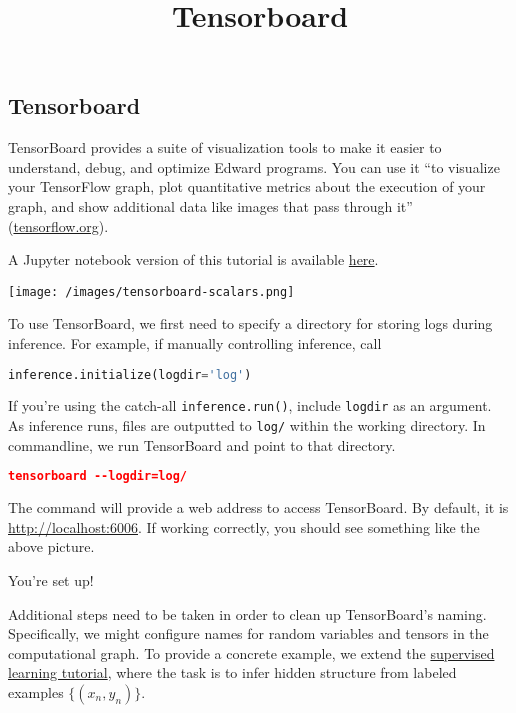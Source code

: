 \title{Tensorboard}

\subsection{Tensorboard}

TensorBoard provides a suite of visualization tools to make it easier
to understand, debug, and optimize Edward programs. You can use it
``to visualize your TensorFlow graph, plot quantitative metrics about
the execution of your graph, and show additional data like images that
pass through it''
(\href{https://www.tensorflow.org/get_started/summaries_and_tensorboard}
{tensorflow.org}).

A Jupyter notebook version of this tutorial is available
\href{http://nbviewer.jupyter.org/github/blei-lab/edward/blob/master/notebooks/tensorboard.ipynb}{here}.

\texttt{[image: /images/tensorboard-scalars.png]}

To use TensorBoard, we first need to specify a directory for storing
logs during inference. For example, if manually controlling inference,
call

\begin{lstlisting}[language=Python]
inference.initialize(logdir='log')
\end{lstlisting}

If you're using the catch-all \texttt{inference.run()}, include
\texttt{logdir} as an argument. As inference runs, files are
outputted to \texttt{log/} within the working directory. In
commandline, we run TensorBoard and point to that directory.

\begin{lstlisting}[language=JSON]
tensorboard --logdir=log/
\end{lstlisting}

The command will provide a web address to access TensorBoard. By
default, it is \url{http://localhost:6006}. If working correctly, you
should see something like the above picture.

You're set up!

Additional steps need to be taken in order to clean up TensorBoard's
naming. Specifically, we might configure names for random variables
and tensors in the computational graph. To provide a concrete example,
we extend the
\href{http://edwardlib.org/tutorials/supervised-regression}
{supervised learning tutorial},
where the task is to infer hidden structure from labeled examples
$\{(x_n, y_n)\}$.

